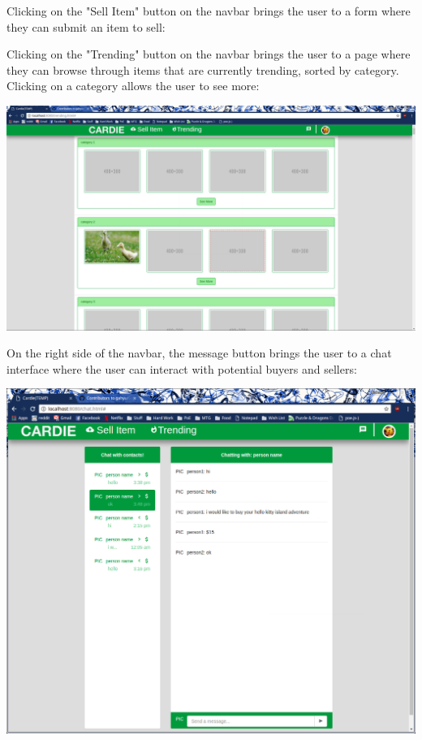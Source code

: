 \documentclass[10pt, titlepage]{article}
\begin{document}
\noindent Clicking on the "Sell Item" button on the navbar brings the user to a form where they can submit an item to sell: \\

\pagebreak

\noindent Clicking on the "Trending" button on the navbar brings the user to a page where they can browse through items that are currently trending, sorted by category. Clicking on a category allows the user to see more: \\

\centerline{\includegraphics[scale=.25]{screen_05}}

\pagebreak

\noindent On the right side of the navbar, the message button brings the user to a chat interface where the user can interact with potential buyers and sellers: \\

\centerline{\includegraphics[scale=.4]{screen_04}}
\end{document}
